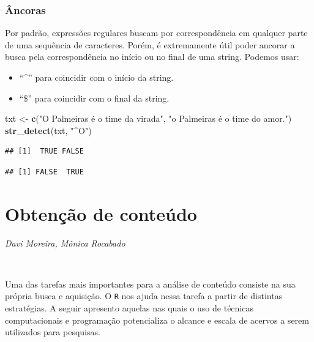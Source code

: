 \documentclass[]{book}
\newenvironment{Shaded}{\begin{snugshade}}{\end{snugshade}}
\newcommand{\CharTok}[1]{\textcolor[rgb]{0.31,0.60,0.02}{#1}}
\newcommand{\KeywordTok}[1]{\textcolor[rgb]{0.13,0.29,0.53}{\textbf{#1}}}
\newcommand{\NormalTok}[1]{#1}
\newcommand{\StringTok}[1]{\textcolor[rgb]{0.31,0.60,0.02}{#1}}
\providecommand{\tightlist}{%
  \setlength{\itemsep}{0pt}\setlength{\parskip}{0pt}}
\begin{document}
\hypertarget{uxe2ncoras}{%
\subsection{Âncoras}\label{uxe2ncoras}}

Por padrão, expressões regulares buscam por correspondência em qualquer parte de uma sequência de caracteres. Porém, é extremamente útil poder ancorar a busca pela correspondência no início ou no final de uma string. Podemos usar:

\begin{itemize}
\tightlist
\item
  ``\^{}'' para coincidir com o início da string.
\item
  ``\$'' para coincidir com o final da string.
\end{itemize}

\begin{Shaded}
\begin{Highlighting}[]
\NormalTok{txt <-}\StringTok{ }\KeywordTok{c}\NormalTok{(}\StringTok{"O Palmeiras é o time da virada"}\NormalTok{, }\StringTok{"o Palmeiras é o time do amor."}\NormalTok{)}
\KeywordTok{str_detect}\NormalTok{(txt, }\StringTok{"^O"}\NormalTok{)}
\end{Highlighting}
\end{Shaded}

\begin{verbatim}
## [1]  TRUE FALSE
\end{verbatim}

\begin{Shaded}
\end{Shaded}

\begin{verbatim}
## [1] FALSE  TRUE
\end{verbatim}

\hypertarget{scrape}{%
\chapter{Obtenção de conteúdo}\label{scrape}}

\emph{Davi Moreira, Mônica Rocabado}

\(~\)

Uma das tarefas mais importantes para a análise de conteúdo consiste na sua própria
busca e aquisição. O \texttt{R} nos ajuda nessa tarefa a partir de distintas estratégias.
A seguir apresento aquelas nas quais o uso de técnicas computacionais e programação
potencializa o alcance e escala de acervos a serem utilizados para pesquisas.
\end{document}

